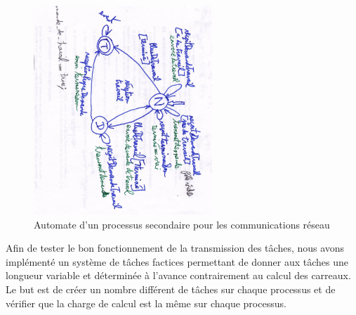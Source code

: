 \begin{figure}[H]
\centering
\includegraphics[width=0.6\textwidth]{automate.jpg}
\caption{Automate d'un processus secondaire pour les communications réseau}
\label{fig:diff}
\end{figure}

Afin de tester le bon fonctionnement de la transmission des tâches, nous avons implémenté un système de tâches factices permettant de donner aux tâches une longueur variable et déterminée à l'avance contrairement au calcul des carreaux. Le but est de créer un nombre différent de tâches sur chaque processus et de vérifier que la charge de calcul est la même sur chaque processus.

